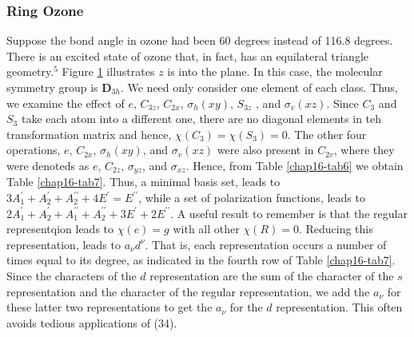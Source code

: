 \subsubsection{Ring Ozone}

\begin{figure}
\caption{}
\label{chap16-fig35}
\end{figure}

Suppose the bond angle in ozone had been 60 degrees instead of 116.8
degrees.  There is an excited state of ozone that, in fact, has an
equilateral triangle geometry.$^5$ Figure \ref{chap16-fig35}
illustrates $z$ is into the plane.  In this case, the molecular
symmetry group is {\bf D}$_{3h}$.  We need only consider one element
of each class.  Thus, we examine the effect of $e$, $C_{3z}$,
$C_{2x}$, $\sigma_h(xy)$, $S_{3z}$ , and $\sigma_v(xz)$.  Since $C_3$
and $S_3$ take each atom into a different one, there are no diagonal
elements in teh transformation matrix and hence, $\chi(C_3)=\chi(S_3)
= 0$.  The other four operations, $e$, $C_{2x}$, $\sigma_h(xy)$, and
$\sigma_v(xz)$ were also present in $C_{2v}$, where they were denoteds
as $e$, $C_{2z}$, $\sigma_{yz}$, and $\sigma_{xz}$.  Hence, from Table
\ref{chap16-tab6} we obtain Table \ref{chap16-tab7}.  Thus, a minimal
basis set, leads to $3A^{\prime}_1 + A^{\prime}_2 + A^{\prime
\prime}_2 + 4 E^{\prime} = E^{\prime \prime}$, while a set of
polarization functions, leads to $2A^{\prime}_1 + A^{\prime}_2 +
A_1^{\prime \prime} + A_2^{\prime \prime} + 3E^{\prime} + 2 E^{\prime
\prime}$.  A useful result to remember is that the regular
representqion leads to $\chi(e) = g$ with all other $\chi(R) = 0$.
Reducing this representation, leads to $a_{\nu} d^{\nu}$.  That is,
each representation occurs a number of times equal to its degree, as
indicated in the fourth row of Table \ref{chap16-tab7}.  Since the
characters of the $d$ representation are the sum of the character of
the $s$ representation and the character of the regular
representation, we add the $a_{\nu}$ for these latter two
representations to get the $a_{\nu}$ for the $d$ representation.  This
often avoids tedious applications of (34).


